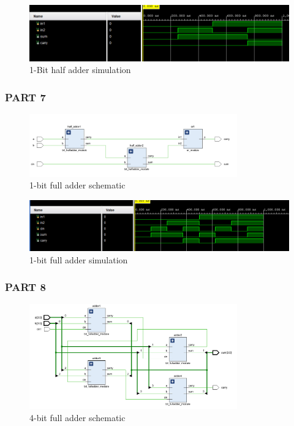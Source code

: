 \documentclass[pdftex,12pt,a4paper]{article}
\begin{document}
    \begin{figure}[H]
    	\centering
    	\includegraphics[width=1\textwidth]{simulations/half_bit_adder_sim.png}	
    	\caption{1-Bit half adder simulation}
    	\label{1-Bit half adder simulation}
    \end{figure}
\subsubsection{PART 7}
    \begin{figure}[H]
    	\centering
    	\includegraphics[width=0.8\textwidth]{schematic/1bit_full_adder_schem.png}	
    	\caption{1-bit full adder schematic}
    	\label{1-bit full adder schematic}
    \end{figure}
    
    \begin{figure}[H]
    	\centering
    	\includegraphics[width=1\textwidth]{simulations/1bit_full_adder_sim.png}	
    	\caption{1-bit full adder simulation}
    	\label{1-bit full adder simulation}
    \end{figure}
\subsubsection{PART 8}
    \begin{figure}[H]
    	\centering
    	\includegraphics[width=0.8\textwidth]{schematic/4bitadder_schematic.png}	
    	\caption{4-bit full adder schematic}
    	\label{4-bit full adder schematic}
    \end{figure}
    
\end{document}

